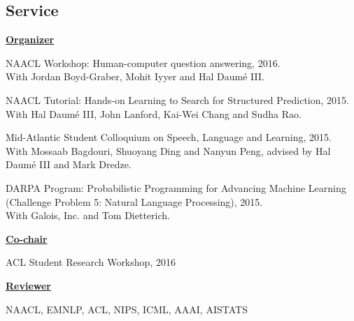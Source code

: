 \documentclass[margin,line]{resume}
\begin{document}
\begin{resume}

\section{\sc Service}
{\bf\underline{Organizer}}

NAACL Workshop: Human-computer question answering, 2016.\\
With Jordan Boyd-Graber, Mohit Iyyer and Hal Daum\'e III.

NAACL Tutorial: Hands-on Learning to Search for Structured Prediction, 2015.\\
With Hal Daum\'e III, John Lanford, Kai-Wei Chang and Sudha Rao.

Mid-Atlantic Student Colloquium on Speech, Language and Learning, 2015.\\
With Mossaab Bagdouri, Shuoyang Ding and Nanyun Peng, advised by Hal Daum\'e III and Mark Dredze.

DARPA Program: Probabilistic Programming for Advancing Machine Learning (Challenge Problem 5: Natural Language Processing), 2015.\\
With Galois, Inc. and Tom Dietterich.

{\bf\underline{Co-chair}}

ACL Student Research Workshop, 2016

{\bf\underline{Reviewer}}

NAACL, EMNLP, ACL, NIPS, ICML, AAAI, AISTATS

\end{resume}
\end{document}
